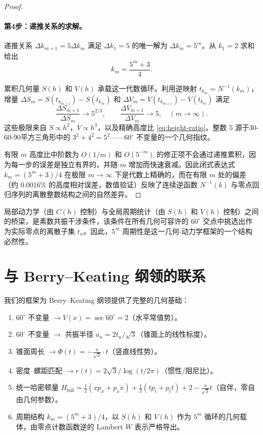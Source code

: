 \documentclass[12pt,a4paper]{article}
\begin{document}
\begin{proof}
\paragraph{第4步：递推关系的求解。}
递推关系 $\Delta k_{m+1} = 5 \Delta k_m$ 满足 $\Delta k_1 = 5$ 的唯一解为 $\Delta k_m = 5^m$。从 $k_1 = 2$ 求和给出
\begin{equation}
\boxed{k_m = \frac{5^m + 3}{4}}.
\end{equation}

累积几何量 $S(h)$ 和 $V(h)$ 承载这一代数循环。利用逆映射 $t_{k_m} = N^{-1}(k_m)$，增量 $\Delta S_m = S(t_{k_{m+1}}) - S(t_{k_m})$ 和 $\Delta V_m = V(t_{k_{m+1}}) - V(t_{k_m})$ 满足
\begin{equation}
\frac{\Delta S_{m+1}}{\Delta S_m} \to 5^{2/3}, \qquad \frac{\Delta V_{m+1}}{\Delta V_m} \to 5, \quad (m \to \infty).
\end{equation}
这些极限来自 $S \propto h^2$，$V \propto h^3$，以及精确高度比 \eqref{eq:height-ratio}。整数 $5$ 源于30-60-90平方三角形中的 $3^2+4^2=5^2$——$60^\circ$ 不变量的一个几何指纹。

有限 $m$ 高度比中阶数为 $O(1/m)$ 和 $O(5^{-m})$ 的修正项不会通过递推累积，因为每一步的误差是独立有界的，并随 $m$ 增加而快速衰减。因此闭式表达式 $k_m = (5^m+3)/4$ 在极限 $m \to \infty$ 下是代数上精确的，而在有限 $m$ 处的偏差（约 $0.0016\%$ 的高度相对误差，数值验证）反映了连续逆函数 $N^{-1}(k)$ 与零点回归序列的离散整数结构之间的自然差异。
\end{proof}

局部动力学（由 $C(h)$ 控制）与全局周期统计（由 $S(h)$ 和 $V(h)$ 控制）之间的桥梁，是素数共振干涉条件，该条件在所有几何可容许的 $60^\circ$ 交点中挑选出作为实际零点的离散子集 $t_n$。因此，$5^m$ 周期性是这一几何-动力学框架的一个结构必然性。

\section{与 Berry--Keating 纲领的联系}

我们的框架为 Berry--Keating 纲领提供了完整的几何基础：

\begin{enumerate}
\item $60^\circ$ 不变量 $\to V(x) = \sec 60^\circ = 2$（水平常值势）。
\item $60^\circ$ 不变量 $\to$ 共振半径 $a_n = 2t_n/\sqrt{3}$（锥面上的线性标度）。
\item 锥面周长 $\to \Phi(t) = -\frac{\pi}{\sqrt{3}} \cdot t$（竖直线性势）。
\item 密度--螺距匹配 $\to r(t) = 2\sqrt{3}/\log(t/2\pi)$（惯性/阻尼比）。
\item 统一哈密顿量 $H_{\text{full}} = \frac{1}{2}(x p_x + p_x x) + \frac{1}{2}(t p_t + p_t t) + 2 - \frac{\pi}{\sqrt{3}}t$（自伴，零自由几何参数）。
\item 周期结构 $k_m = (5^m+3)/4$，以 $S(h)$ 和 $V(h)$ 作为 $5^m$ 循环的几何载体，由零点计数函数逆的 Lambert $W$ 表示严格导出。
\end{enumerate}
\end{document}
